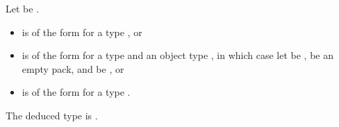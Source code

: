 \begin{itemdescr}
\pnum
Let  be .

\pnum
\constraints
\begin{itemize}
\item
{} is of the form
 for a type , or
\item
{} is of the form
 for a type  and an object type ,
in which case
let  be ,
 be an empty pack, and
 be , or
\item
{} is of the form
 for a type .
\end{itemize}

\pnum
\remarks
The deduced type is .
\end{itemdescr}
